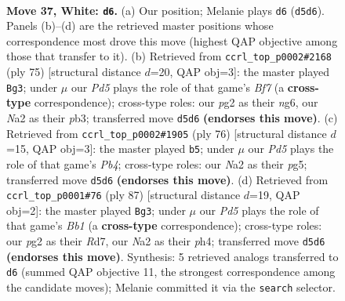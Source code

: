 \documentclass[11pt]{article}
\begin{document}
\clearpage

\begin{figure}[p]\centering
\begin{subfigure}{0.46\textwidth}\centering
\resizebox{\linewidth}{!}{%
\newchessgame
\chessboard[
  setfen={3kn3/4b3/8/2pP4/8/1P6/N2K2p1/8 w - - 0 37},
  showmover=false,
  pgfstyle=straightmove, color=movearrow, markmove={d5-d6}
]}
\caption{}
\end{subfigure}\hfill
\begin{subfigure}{0.46\textwidth}\centering
\resizebox{\linewidth}{!}{%
\newchessgame
\chessboard[
  setfen={8/2n5/p1k3N1/5B1p/4K3/1P3P2/1P3b2/8 b - - 2 38},
  showmover=false,
  pgfstyle=straightmove, color=movearrow, markmove={f2-g3}
]}
\caption{}
\end{subfigure}
\\[4pt]
\begin{subfigure}{0.46\textwidth}\centering
\resizebox{\linewidth}{!}{%
\newchessgame
\chessboard[
  setfen={8/N2b3p/4k3/5pp1/1P1K4/6P1/7P/8 w - - 0 39},
  showmover=false,
  pgfstyle=straightmove, color=movearrow, markmove={b4-b5}
]}
\caption{}
\end{subfigure}\hfill
\begin{subfigure}{0.46\textwidth}\centering
\resizebox{\linewidth}{!}{%
\newchessgame
\chessboard[
  setfen={1b6/3r4/5p1k/8/P6P/8/2B1R3/1K6 b - - 0 44},
  showmover=false,
  pgfstyle=straightmove, color=movearrow, markmove={b8-g3}
]}
\caption{}
\end{subfigure}
\caption{\textbf{Move 37, White: \texttt{d6}.} (a) Our position; Melanie plays \texttt{d6} (\texttt{d5d6}). Panels (b)--(d) are the retrieved master positions whose correspondence most drove this move (highest QAP objective among those that transfer to it). (b) Retrieved from \texttt{ccrl\_top\_p0002\#2168} (ply 75) [structural distance $d$=20, QAP obj=3]: the master played \texttt{Bg3}; under $\mu$ our \emph{Pd5} plays the role of that game's \emph{Bf7} (a \textbf{cross-type} correspondence); cross-type roles: our \emph{p}g2 as their \emph{n}g6, our \emph{N}a2 as their \emph{p}b3; transferred move \texttt{d5d6} \textbf{(endorses this move)}. (c) Retrieved from \texttt{ccrl\_top\_p0002\#1905} (ply 76) [structural distance $d$=15, QAP obj=3]: the master played \texttt{b5}; under $\mu$ our \emph{Pd5} plays the role of that game's \emph{Pb4}; cross-type roles: our \emph{N}a2 as their \emph{p}g5; transferred move \texttt{d5d6} \textbf{(endorses this move)}. (d) Retrieved from \texttt{ccrl\_top\_p0001\#76} (ply 87) [structural distance $d$=19, QAP obj=2]: the master played \texttt{Bg3}; under $\mu$ our \emph{Pd5} plays the role of that game's \emph{Bb1} (a \textbf{cross-type} correspondence); cross-type roles: our \emph{p}g2 as their \emph{R}d7, our \emph{N}a2 as their \emph{p}h4; transferred move \texttt{d5d6} \textbf{(endorses this move)}. Synthesis: 5 retrieved analogs transferred to \texttt{d6} (summed QAP objective 11, the strongest correspondence among the candidate moves); Melanie committed it via the \texttt{search} selector.}
\label{fig:thought-m72}
\end{figure}
\end{document}
